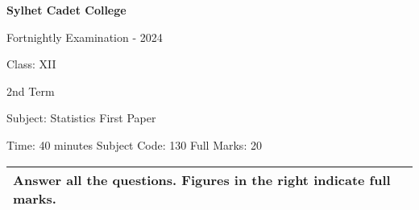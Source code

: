 \documentclass[10pt]{article}
\begin{document}
\begin{center}
  \bfseries\large
  Sylhet Cadet College

\normalsize
Fortnightly Examination - 2024

  Class: XII
  
  2nd Term

  Subject: Statistics First Paper

  Time: 40 minutes \qquad \qquad  \qquad \qquad Subject Code: 130  \qquad  \qquad \qquad  \qquad Full Marks: 20

\end{center}

\noindent
\begin{tabular}{p{\dimexpr\linewidth-2\tabcolsep}}
  \textbf{Answer all the questions. Figures in the right indicate full marks.}\\
  \hline
\end{tabular}
\end{document}
